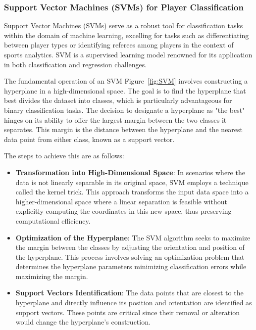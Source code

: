 \documentclass[12pt, letterpaper]{article}
\begin{document}
{\begin{spacing}{1.2}
\subsubsection{Support Vector Machines (SVMs) for Player Classification}

Support Vector Machines (SVMs) serve as a robust tool for classification tasks within the domain of machine learning, excelling for tasks such as differentiating between player types or identifying referees among players in the context of sports analytics. SVM is a supervised learning model renowned for its application in both classification and regression challenges.

The fundamental operation of an SVM Figure~\ref{fig:SVM} involves constructing a hyperplane in a high-dimensional space. The goal is to find the hyperplane that best divides the dataset into classes, which is particularly advantageous for binary classification tasks. The decision to designate a hyperplane as "the best" hinges on its ability to offer the largest margin between the two classes it separates. This margin is the distance between the hyperplane and the nearest data point from either class, known as a support vector.

The steps to achieve this are as follows:

\begin{itemize}
    \item \textbf{Transformation into High-Dimensional Space}: In scenarios where the data is not linearly separable in its original space, SVM employs a technique called the kernel trick. This approach transforms the input data space into a higher-dimensional space where a linear separation is feasible without explicitly computing the coordinates in this new space, thus preserving computational efficiency.

    \item \textbf{Optimization of the Hyperplane}: The SVM algorithm seeks to maximize the margin between the classes by adjusting the orientation and position of the hyperplane. This process involves solving an optimization problem that determines the hyperplane parameters minimizing classification errors while maximizing the margin.

    \item \textbf{Support Vectors Identification}: The data points that are closest to the hyperplane and directly influence its position and orientation are identified as support vectors. These points are critical since their removal or alteration would change the hyperplane's construction.


\end{itemize}
\end{spacing}}
\end{document}
